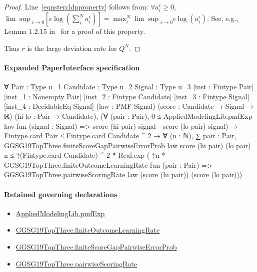 \documentclass[10pt]{article}
\begin{document}
\begin{ReviewVerbatim}
\begin{proof}
Line~\eqref{eqnstep:ldpproperty} follows from: $\forall a^\epsilon_i \geq 0$, ${\lim \sup}_{\epsilon \to 0} \left[\epsilon\log\left(\sum_i^N a^\epsilon_i\right)\right] = \max^N_i {\lim \sup}_{\epsilon \to 0} \epsilon \log(a^\epsilon_i)$.
See, e.g., Lemma 1.2.15 in~\cite{dembo_large_2010} for a proof of this property.

Thus $r$ is the large deviation rate for $Q^N$.

\end{proof}
\end{ReviewVerbatim}



\paragraph{Expanded PaperInterface specification}
\begin{ReviewVerbatim}
∀ {Pair : Type u_1} {Candidate : Type u_2} {Signal : Type u_3} [inst : Fintype Pair] [inst_1 : Nonempty Pair]
  [inst_2 : Fintype Candidate] [inst_3 : Fintype Signal] [inst_4 : DecidableEq Signal] (law : PMF Signal)
  (score : Candidate → Signal → ℝ) (hi lo : Pair → Candidate),
  (∀ (pair : Pair),
      0 ≤ AppliedModelingLib.pmfExp law fun (signal : Signal) => score (hi pair) signal - score (lo pair) signal) →
    Fintype.card Pair ≤ Fintype.card Candidate ^ 2 →
      ∀ (n : ℕ),
        ∑ pair : Pair, GGSG19TopThree.finiteScoreGapPairwiseErrorProb law score (hi pair) (lo pair) n ≤
          ↑(Fintype.card Candidate) ^ 2 *
            Real.exp
              (-↑n *
                GGSG19TopThree.finiteOutcomeLearningRate fun (pair : Pair) =>
                  GGSG19TopThree.pairwiseScoringRate law (score (hi pair)) (score (lo pair)))
\end{ReviewVerbatim}

\paragraph{Retained governing declarations}
\begin{itemize}\raggedright
\item \hyperlink{governing-declaration-8e4b4389a4f6454b}{Applied\allowbreak{}Modeling\allowbreak{}Lib.\allowbreak{}pmf\allowbreak{}Exp}
\item \hyperlink{governing-declaration-6ccba7634ffd53cd}{GGSG19\allowbreak{}Top\allowbreak{}Three.\allowbreak{}finite\allowbreak{}Outcome\allowbreak{}Learning\allowbreak{}Rate}
\item \hyperlink{governing-declaration-d8a6ed8ce06dfbde}{GGSG19\allowbreak{}Top\allowbreak{}Three.\allowbreak{}finite\allowbreak{}Score\allowbreak{}Gap\allowbreak{}Pairwise\allowbreak{}Error\allowbreak{}Prob}
\item \hyperlink{governing-declaration-e33f15f580bb4893}{GGSG19\allowbreak{}Top\allowbreak{}Three.\allowbreak{}pairwise\allowbreak{}Scoring\allowbreak{}Rate}
\end{itemize}
\end{document}
